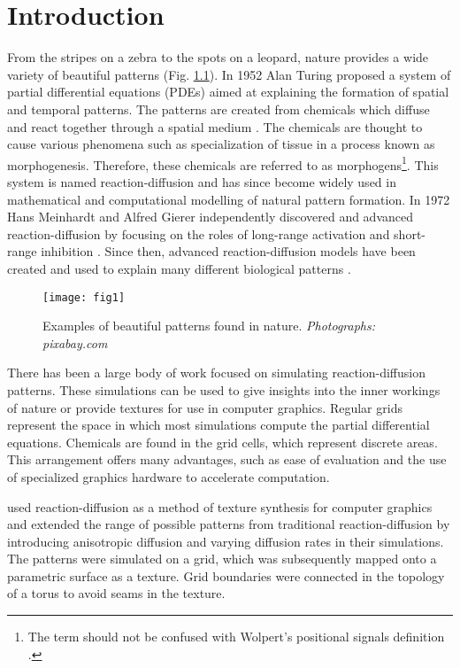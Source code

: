 \chapter{Introduction}
From the stripes on a zebra to the spots on a leopard, nature provides a wide variety of beautiful patterns (Fig. \ref{fig:naturalPatterns1}). In 1952 Alan Turing proposed a system of partial differential equations (PDEs) aimed at explaining the formation of spatial and temporal patterns. The patterns are created from chemicals which diffuse and react together through a spatial medium \citep{turing1952}. The chemicals are thought to cause various phenomena such as specialization of tissue in a process known as morphogenesis. Therefore, these chemicals are referred to as morphogens\footnote{The term  should not be confused with Wolpert’s positional signals definition \citep{wolpert1996}.}. This system is named reaction-diffusion and has since become widely used in mathematical and computational modelling of natural pattern formation. In 1972 Hans Meinhardt and Alfred Gierer independently discovered and advanced reaction-diffusion by focusing on the roles of long-range activation and short-range inhibition \citep{gierer1972}. Since then, advanced reaction-diffusion models have been created and used to explain many different biological patterns \citep{garzon2011, fowler1992, lefevre2010, meinhardt2009}.

\begin{figure}[H]
  \centering
  \texttt{[image: fig1]}
  \caption{Examples of beautiful patterns found in nature. \textit{Photographs: pixabay.com}}
  \label{fig:naturalPatterns1}
\end{figure}

There has been a large body of work focused on simulating reaction-diffusion patterns. These simulations can be used to give insights into the inner workings of nature or provide textures for use in computer graphics. Regular grids represent the space in which most simulations compute the partial differential equations. Chemicals are found in the grid cells, which represent discrete areas. This arrangement offers many advantages, such as ease of evaluation and the use of specialized graphics hardware to accelerate computation.

\citet{witkin1991} used reaction-diffusion as a method of texture synthesis for computer graphics and extended the range of possible patterns from traditional reaction-diffusion by introducing anisotropic diffusion and varying diffusion rates in their simulations. The patterns were simulated on a grid, which was subsequently mapped onto a parametric surface as a texture. Grid boundaries were connected in the topology of a torus to avoid seams in the texture.

